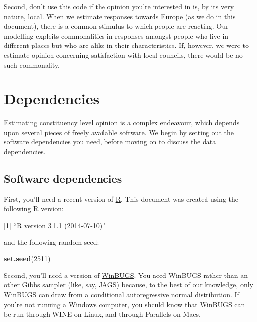 \documentclass[12pt,twoside]{article}
\newenvironment{Shaded}{}{}
\newcommand{\KeywordTok}[1]{\textcolor[rgb]{0.00,0.44,0.13}{\textbf{{#1}}}}
\newcommand{\DecValTok}[1]{\textcolor[rgb]{0.25,0.63,0.44}{{#1}}}
\newcommand{\NormalTok}[1]{{#1}}
\begin{document}
Second, don't use this code if the opinion you're interested in is, by
its very nature, local. When we estimate responses towards Europe (as we
do in this document), there is a common stimulus to which people are
reacting. Our modelling exploits commonalities in responses amongst
people who live in different places but who are alike in their
characteristics. If, however, we were to estimate opinion concerning
satisfaction with local councils, there would be no such commonality.

\section{Dependencies}\label{dependencies}

Estimating constituency level opinion is a complex endeavour, which
depends upon several pieces of freely available software. We begin by
setting out the software dependencies you need, before moving on to
discuss the data dependencies.

\subsection{Software dependencies}\label{software-dependencies}

First, you'll need a recent version of
\href{http://www.r-project.org/}{R}. This document was created using the
following R version:

\begin{Shaded}
\end{Shaded}

{[}1{]} ``R version 3.1.1 (2014-07-10)''

and the following random seed:

\begin{Shaded}
\begin{Highlighting}[]
\KeywordTok{set.seed}\NormalTok{(}\DecValTok{2511}\NormalTok{)}
\end{Highlighting}
\end{Shaded}

Second, you'll need a version of
\href{http://www.mrc-bsu.cam.ac.uk/software/bugs/the-bugs-project-winbugs/}{WinBUGS}.
You need WinBUGS rather than an other Gibbs sampler (like, say,
\href{http://mcmc-jags.sourceforge.net/}{JAGS}) because, to the best of
our knowledge, only WinBUGS can draw from a conditional autoregressive
normal distribution. If you're not running a Windows computer, you
should know that WinBUGS can be run through WINE on Linux, and through
Parallels on Macs.
\end{document}
